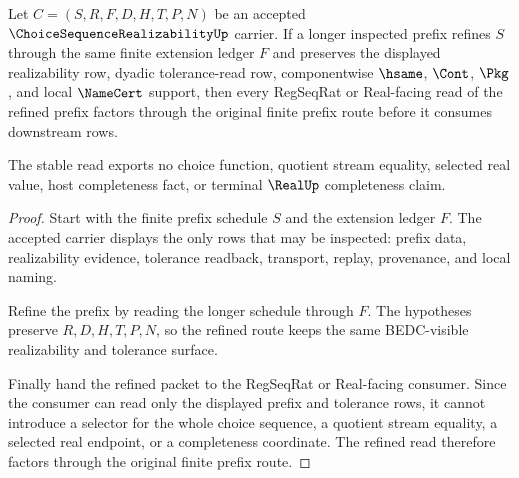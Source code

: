 \begin{theorem}
\label{thm:choice-sequence-realizability-prefix-stability}
Let $C=(S,R,F,D,H,T,P,N)$ be an accepted $\ChoiceSequenceRealizabilityUp$ carrier. If a longer inspected prefix refines $S$ through the same finite extension ledger $F$ and preserves the displayed realizability row, dyadic tolerance-read row, componentwise $\hsame$, $\Cont$, $\Pkg$, and local $\NameCert$ support, then every RegSeqRat or Real-facing read of the refined prefix factors through the original finite prefix route before it consumes downstream rows.

The stable read exports no choice function, quotient stream equality, selected real value, host completeness fact, or terminal $\RealUp$ completeness claim.
\end{theorem}
\begin{proof}
Start with the finite prefix schedule $S$ and the extension ledger $F$. The accepted carrier displays the only rows that may be inspected: prefix data, realizability evidence, tolerance readback, transport, replay, provenance, and local naming.

Refine the prefix by reading the longer schedule through $F$. The hypotheses preserve $R,D,H,T,P,N$, so the refined route keeps the same BEDC-visible realizability and tolerance surface.

Finally hand the refined packet to the RegSeqRat or Real-facing consumer. Since the consumer can read only the displayed prefix and tolerance rows, it cannot introduce a selector for the whole choice sequence, a quotient stream equality, a selected real endpoint, or a completeness coordinate. The refined read therefore factors through the original finite prefix route.
\end{proof}

